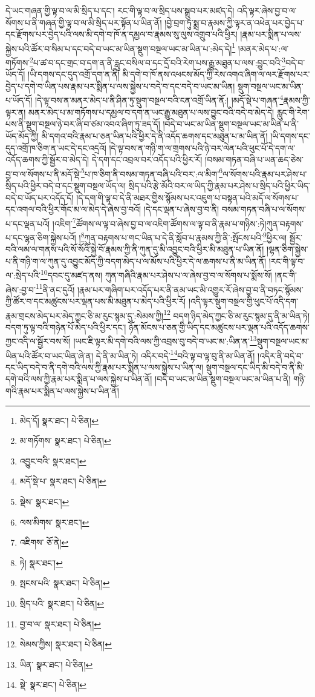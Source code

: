 དེ་ཡང་གཞན་གྱི་ལྟ་བ་ལ་མི་སྲིད་པ་དང་། རང་གི་ལྟ་བ་ལ་སྲིད་པས་སྒྲུབ་པར་མཛད་དེ། འདི་ལྟར་ཞེས་བྱ་བ་ལ་སོགས་པ་ནི་གཞན་གྱི་ལྟ་བ་ལ་མི་སྲིད་པར་སྟོན་པ་ཡིན་ནོ། །བྱེ་བྲག་ཏུ་སྨྲ་བ་རྣམས་ཀྱི་ལྟར་ན་འཕེན་པར་བྱེད་པ་དང་རྫོགས་པར་བྱེད་པའི་ལས་མི་དགེ་བ་ཁོ་ན་དམྱལ་བ་རྣམས་སུ་ལུས་འགྲུབ་པའི་ཕྱིར། །རྣམ་པར་སྨིན་པ་ལས་སྐྱེས་པའི་ཚོར་བ་སིམ་པ་དང་བདེ་བ་ཡང་མ་ཡིན་སྡུག་བསྔལ་ཡང་མ་ཡིན་པ་:མེད་དེ།\footnote{མེད་དོ།  སྣར་ཐང་།  པེ་ཅིན། } །མནར་མེད་པ་:ལ་གཏོགས་\footnote{མ་གཏོགས་  སྣར་ཐང་།  པེ་ཅིན། }པ་ཚ་བ་དང་གྲང་བ་དག་ན་ནི་རླུང་བསིལ་བ་དང་དྲོ་བའི་རེག་པས་རྒྱུ་མཐུན་པ་ལས་:བྱུང་བའི་\footnote{འབྱུང་བའི་  སྣར་ཐང་། }བདེ་བ་ཡོད་དོ། །ཡི་དགས་དང་དུད་འགྲོ་དག་ན་ནི། མི་དགེ་བ་ཁོ་ནས་འཕངས་མོད་ཀྱི་རེས་འགའ་ཞིག་ལ་ལར་རྫོགས་པར་བྱེད་པ་དགེ་བ་ཡིན་པས་རྣམ་པར་སྨིན་པ་ལས་སྐྱེས་པ་བདེ་བ་དང་བདེ་བ་ཡང་མ་ཡིན། སྡུག་བསྔལ་ཡང་མ་ཡིན་པ་ཡོད་དོ། །དེ་ལྟ་བས་ན་མནར་མེད་པ་ནི་ཤིན་ཏུ་སྡུག་བསྔལ་བའི་ངན་འགྲོ་ཡིན་ནོ:། །མདོ་སྡེ་པ་གཞན་\footnote{མདོ་སྡེ་པ་  སྣར་ཐང་།  པེ་ཅིན། }རྣམས་ཀྱི་ལྟར་ན། མནར་མེད་པ་མ་གཏོགས་པ་དམྱལ་བ་དག་ན་ཡང་རྒྱུ་མཐུན་པ་ལས་བྱུང་བའི་བདེ་བ་མེད་དེ། རླུང་གི་རེག་པས་ནི་སྡུག་བསྔལ་ཉེ་བར་ཞི་བ་ཙམ་འབའ་ཞིག་ཏུ་ཟད་དོ། །བདེ་བ་ཡང་མ་ཡིན་སྡུག་བསྔལ་ཡང་མ་ཡིན་པ་ནི་ཡོད་མོད་ཀྱི། མི་དགའ་བའི་རྣམ་པ་ཅན་ཡིན་པའི་ཕྱིར་དེ་ནི་འདོད་ཆགས་དང་མཐུན་པ་མ་ཡིན་ནོ། །ཡི་དགས་དང་དུད་འགྲོ་ཁ་ཅིག་ན་ཡང་དེ་དང་འདྲའོ། །དེ་ལྟ་བས་ན་གཉི་ག་ལ་གྲགས་པའི་ཉེ་བར་ལེན་པའི་ཕུང་པོ་དེ་དག་ལ་འདོད་ཆགས་ཀྱི་སྦྱོར་བ་མེད་དེ། དེ་དག་དང་འབྲལ་བར་འདོད་པའི་ཕྱིར་རོ། །བསམ་གཏན་བཞི་པ་ཡན་ཆད་ཅེས་བྱ་བ་ལ་སོགས་པ་ནི་མདོ་སྡེ་\footnote{སྡེས་  སྣར་ཐང་། }པ་ཁ་ཅིག་ནི་བསམ་གཏན་བཞི་པའི་བར་:ལ་མིག་\footnote{ལས་མིགས་  སྣར་ཐང་། }ལ་སོགས་པའི་རྣམ་པར་ཤེས་པ་སྲིད་པའི་ཕྱིར་བདེ་བ་དང་སྡུག་བསྔལ་ཡོད་ལ། སྲིད་པའི་རྩེ་མོའི་བར་ལ་ཡིད་ཀྱི་རྣམ་པར་ཤེས་པ་སྲིད་པའི་ཕྱིར་ཡིད་བདེ་བ་ཡོད་པར་འདོད་དོ། །དེ་དག་གི་ལྟ་བ་དེ་ནི་མཐར་གྱིས་སྙོམས་པར་འཇུག་པ་བསྟན་པའི་མདོ་ལ་སོགས་པ་དང་འགལ་བའི་ཕྱིར་གོང་མ་ལ་མེད་དེ་ཞེས་བྱ་བའོ། །དེ་དང་ལྡན་པ་ཞེས་བྱ་བ་ནི། བསམ་གཏན་བཞི་པ་ལ་སོགས་པ་དང་ལྡན་པའོ། །འཇིག་\footnote{འཇིགས་  ཅོ་ནེ། }ཚོགས་ལ་ལྟ་བ་ཞེས་བྱ་བ་ལ་འཇིག་ཚོགས་ལ་ལྟ་བ་ནི་རྣམ་པ་གཉིས་:ཏེ།ཀུན་བརྟགས་པ་དང་ལྷན་ཅིག་སྐྱེས་པའོ། །\footnote{ཏེ།  སྣར་ཐང་། }ཀུན་བརྟགས་པ་གང་ཡིན་པ་དེ་ནི་སློབ་པ་རྣམས་ཀྱི་ནི་:སྤོངས་པའི་\footnote{སྤངས་པའི་  སྣར་ཐང་།  པེ་ཅིན། }ཕྱིར་ལ། སྦྱོར་བའི་ལམ་ལ་གནས་པའི་སོ་སོའི་སྐྱེ་བོ་རྣམས་ཀྱི་ནི་ཀུན་དུ་མི་འབྱུང་བའི་ཕྱིར་མི་མཐུན་པ་ཡིན་ནོ། །ལྷན་ཅིག་སྐྱེས་པ་ནི་གཉི་ག་ལ་ཀུན་དུ་འབྱུང་མོད་ཀྱི་བདག་མེད་པ་ལ་མོས་པའི་ཕྱིར་དེ་ལ་ཆགས་པ་ནི་མ་ཡིན་ནོ། །རང་གི་ལྟ་བ་ལ་:སྲེད་པའི་\footnote{སྲིད་པའི་  སྣར་ཐང་།  པེ་ཅིན། }དབང་དུ་མཛད་ནས། ཀུན་གཞིའི་རྣམ་པར་ཤེས་པ་ལ་ཞེས་བྱ་བ་ལ་སོགས་པ་སྨོས་སོ། །ནང་གི་ཞེས་:བྱ་བ་\footnote{བྱ་བ་ལ་  སྣར་ཐང་།  པེ་ཅིན། }ནི་ནང་དུའོ། །རྣམ་པར་གཞིག་པར་འདོད་པར་ནི་ནམ་ཡང་མི་འགྱུར་རོ་ཞེས་བྱ་བ་ནི་བཏང་སྙོམས་ཀྱི་ཚོར་བ་དང་མཚུངས་པར་ལྡན་པས་མི་མཐུན་པ་མེད་པའི་ཕྱིར་རོ། །འདི་ལྟར་སྡུག་བསྔལ་གྱི་ཕུང་པོ་འདི་དག་རྣམ་གྲངས་མེད་པར་མེད་ཀྱང་ཅི་མ་རུང་སྙམ་དུ་:སེམས་ཀྱི།\footnote{སེམས་ཀྱིས།  སྣར་ཐང་།  པེ་ཅིན། } བདག་ཉིད་མེད་ཀྱང་ཅི་མ་རུང་སྙམ་དུ་ནི་མ་ཡིན་ཏེ། བདག་ཏུ་ལྟ་བའི་གཉེན་པོ་མེད་པའི་ཕྱིར་དང་། ཉོན་མོངས་པ་ཅན་གྱི་ཡིད་དང་མཚུངས་པར་ལྡན་པའི་འདོད་ཆགས་ཀྱང་འདི་ལ་སྦྱོར་བས་སོ། །ཡང་ཇི་ལྟར་མི་དགེ་བའི་ལས་ཀྱི་འབྲས་བུ་བདེ་བ་ཡང་མ་:ཡིན་ན་\footnote{ཡིན་  སྣར་ཐང་།  པེ་ཅིན། }སྡུག་བསྔལ་ཡང་མ་ཡིན་པའི་ཚོར་བ་ཡང་ཡིན་ཞེ་ན། དེ་ནི་མ་ཡིན་ཏེ། འདིར་བདེ་\footnote{སྡེ་  སྣར་ཐང་།  པེ་ཅིན། }བའི་ལྟ་བ་ལྟ་བུ་ནི་མ་ཡིན་ནོ། །འདིར་ནི་བདེ་བ་དང་ཡིད་བདེ་བ་ནི་དགེ་བའི་ལས་ཀྱི་རྣམ་པར་སྨིན་པ་ལས་སྐྱེས་པ་ཡིན་ལ། སྡུག་བསྔལ་དང་ཡིད་མི་བདེ་བ་ནི་མི་དགེ་བའི་ལས་ཀྱི་རྣམ་པར་སྨིན་པ་ལས་སྐྱེས་པ་ཡིན་ནོ། །བདེ་བ་ཡང་མ་ཡིན་སྡུག་བསྔལ་ཡང་མ་ཡིན་པ་ནི། གཉི་གའི་རྣམ་པར་སྨིན་པ་ལས་སྐྱེས་པ་ཡིན་ནོ། 